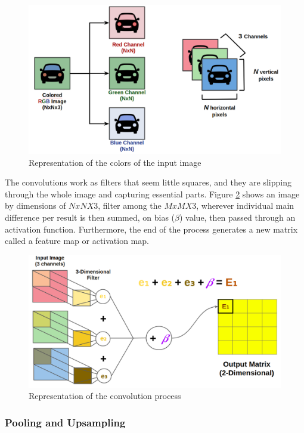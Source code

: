 \begin{figure}[H]
\centering
\includegraphics[scale=0.35]{imagens/rgb_representation.png}
\caption{Representation of the colors of the input image \cite{lecture}}
\label{fig:rgb}
\end{figure}


The convolutions work as filters that seem little squares, and they are slipping through the whole image and capturing essential parts.  Figure \ref{fig:bias} shows an image by dimensions of $NxNX3$, filter among the $MxMX3$, wherever individual main difference per result is then summed, on bias ($\beta$) value, then passed through an activation function. Furthermore, the end of the process generates a new matrix called a feature map or activation map.


\begin{figure}[H]
\centering
\includegraphics[scale=0.3]{imagens/three_dim_conv_2.png}
\caption{Representation of the convolution process \cite{lecture}}
\label{fig:bias}
\end{figure}




\subsubsection{Pooling and Upsampling}\label{sub:pooling}

